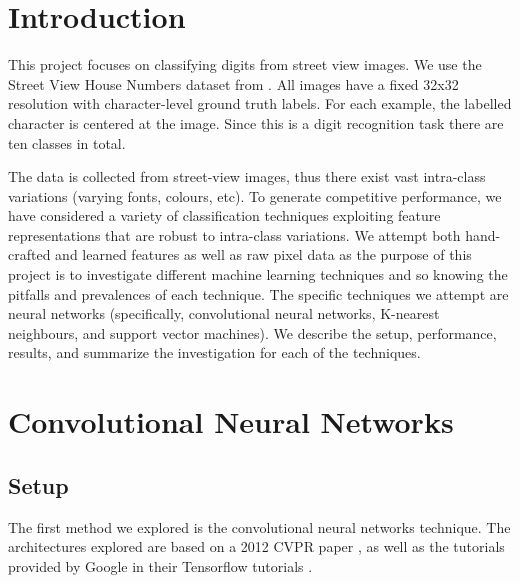 \documentclass{article} %
\begin{document}
\author{Bai, Min \texttt{mbai@cs.toronto.edu}}
\author{Loyzer, Mark \texttt{loyzer@cs.toronto.edu}}

\newcommand{\fix}{\marginpar{FIX}}
\newcommand{\new}{\marginpar{NEW}}

\nipsfinalcopy %

\begin{abstract}

\end{abstract}

\section{Introduction}
This project focuses on classifying digits from street view images.  We use the Street View House Numbers dataset from \cite{svhn}. All images have a fixed 32x32 resolution with character-level ground truth labels. For each example, the labelled character is centered at the image. Since this is a digit recognition task there are ten classes in total.

The data is collected from street-view images, thus there exist vast intra-class variations (varying fonts, colours, etc). To generate competitive performance, we have considered a variety of classification techniques exploiting feature representations that are robust to intra-class variations. We attempt both hand-crafted and learned features as well as raw pixel data as the purpose of this project is to investigate different machine learning techniques and so knowing the pitfalls and prevalences of each technique. The specific techniques we attempt are neural networks (specifically, convolutional neural networks, K-nearest neighbours, and support vector machines).  We describe the setup, performance, results, and summarize the investigation for each of the techniques.

\section{Convolutional Neural Networks}

\subsection{Setup}

The first method we explored is the convolutional neural networks technique. The architectures explored are based on a 2012 CVPR paper \cite{lecun2012}, as well as the tutorials provided by Google in their Tensorflow tutorials \cite{googletensorflow}. 
\end{document}
